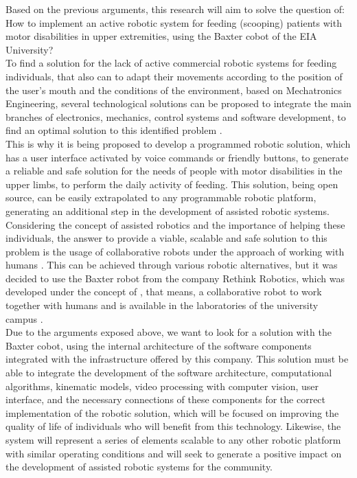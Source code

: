 \documentclass[11pt]{report} %
\begin{document}
Based on the previous arguments, this research will aim to solve the question of:
How to implement an active robotic system for feeding (scooping) patients with motor disabilities in upper extremities, using the Baxter cobot of the EIA University?\\

To find a solution for the lack of active commercial robotic systems for feeding individuals, that also can to adapt their movements according to the position of the user's mouth and the conditions of the environment, based on Mechatronics Engineering, several technological solutions can be proposed to integrate the main branches of electronics, mechanics, control systems and software development, to find an optimal solution to this identified problem \citep{cite_university_eia_general}.\\

This is why it is being proposed to develop a programmed robotic solution, which has a user interface activated by voice commands or friendly buttons, to generate a reliable and safe solution for the needs of people with motor disabilities in the upper limbs, to perform the daily activity of feeding. This solution, being open source, can be easily extrapolated to any programmable robotic platform, generating an additional step in the development of assisted robotic systems.\\

Considering the concept of assisted robotics and the importance of helping these individuals, the answer to provide a viable, scalable and safe solution to this problem is the usage of collaborative robots under the approach of working with humans  \citep{cite_rethink_robotics_baxter_factory_worker}. This can be achieved through various robotic alternatives, but it was decided to use the Baxter robot from the company Rethink Robotics, which was developed under the concept of , that means, a collaborative robot to work together with humans and is available in the laboratories of the university campus \citep{cite_university_eia_general}.\\

Due to the arguments exposed above, we want to look for a solution with the Baxter cobot, using the internal architecture of the software components integrated with the infrastructure offered by this company. This solution must be able to integrate the development of the software architecture, computational algorithms, kinematic models, video processing with computer vision, user interface,  and the necessary connections of these components for the correct implementation of the robotic solution, which will be focused on improving the quality of life of individuals who will benefit from this technology. Likewise, the system will represent a series of elements scalable to any other robotic platform with similar operating conditions and will seek to generate a positive impact on the development of assisted robotic systems for the community.\\
\end{document}
